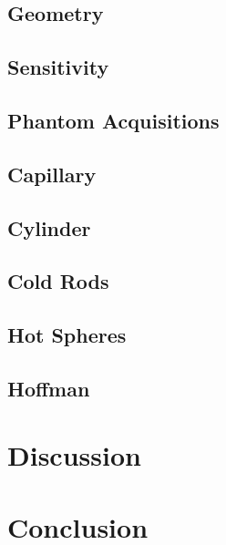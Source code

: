 \subsection{Geometry}
\subsection{Sensitivity}
\subsection{Phantom Acquisitions}
\subsection{Capillary}
\subsection{Cylinder}
\subsection{Cold Rods}
\subsection{Hot Spheres} 
\subsection{Hoffman}

\section{Discussion}

\section{Conclusion}